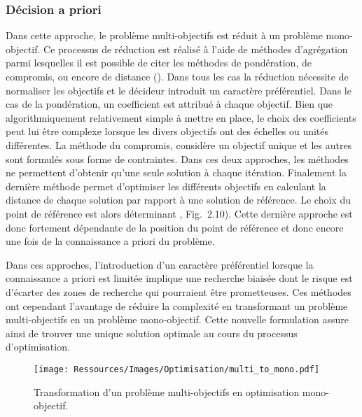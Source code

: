 \subsubsection{Décision a priori} %
\label{ssub:decision_a_priori}
Dans cette approche, le problème multi-objectifs est réduit à un problème mono-objectif.
Ce processus de réduction est réalisé à l’aide de méthodes d’agrégation parmi lesquelles
il est possible de citer les méthodes de pondération, de compromis,
ou encore de distance (). Dans tous les cas la réduction
nécessite de normaliser les objectifs et le décideur introduit un caractère préférentiel.
Dans le cas de la pondération, un coefficient est attribué à chaque objectif. Bien que
algorithmiquement relativement simple à mettre en place, le choix des coefficients peut
lui être complexe lorsque les divers objectifs ont des échelles ou unités différentes.
La méthode du compromis, considère un objectif unique et les autres sont formulés
sous forme de contraintes. Dans ces deux approches, les méthodes ne permettent
d’obtenir qu’une seule solution à chaque itération.
Finalement la dernière méthode permet d’optimiser les différents objectifs en calculant
la distance de chaque solution par rapport à une solution de référence. Le choix
du point de référence est alors déterminant \parencite{Collette2002}, Fig.~2.10).
Cette dernière approche est donc fortement dépendante de la position du point de
référence et donc encore une fois de la connaissance a priori du problème.

Dans ces approches, l’introduction d’un caractère préférentiel lorsque la connaissance a priori
est limitée implique une recherche biaisée dont le risque est d’écarter des zones
de recherche qui pourraient être prometteuses. Ces méthodes ont cependant l’avantage
de réduire la complexité en transformant un problème multi-objectifs en un problème
mono-objectif. Cette nouvelle formulation assure ainsi de trouver une unique solution
optimale au cours du processus d’optimisation.

\begin{figure}
    \centering
    \texttt{[image: Ressources/Images/Optimisation/multi\_to\_mono.pdf]}
    \caption[Transformation d’un problème multi-objectifs en optimisation mono-objectif]
            {Transformation d’un problème multi-objectifs en optimisation mono-objectif.}
    \label{fig:multi_to_mono}
\end{figure}


